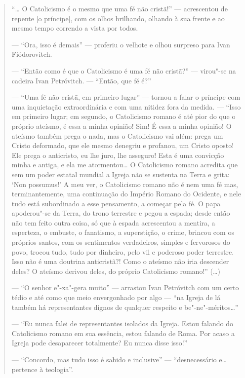 \begin{quote}
``\ldots{} O Catolicismo é o mesmo que uma fé não cristã!'' --- acrescentou
de repente [o príncipe], com os olhos brilhando,
olhando à sua frente e ao mesmo tempo correndo a vista por todos.

--- ``Ora, isso é demais'' --- proferiu o velhote e olhou surpreso
para Ivan Fiódorovitch.

--- ``Então como é que o Catolicismo é uma fé não
cristã?'' --- virou"-se na cadeira Ivan Petróvitch. --- ``Então, que fé é?''

--- ``Uma fé não cristã, em primeiro lugar'' --- tornou a falar o
príncipe com uma inquietação extraordinária e com uma nitidez fora da
medida. --- ``Isso em primeiro lugar; em segundo, o Catolicismo romano é
até pior do que o próprio ateísmo, é essa a minha opinião! Sim! É essa a
minha opinião! O ateísmo também prega o nada, mas o Catolicismo vai
além: prega um Cristo deformado, que ele mesmo denegriu e profanou, um
Cristo oposto! Ele prega o anticristo, eu lhe juro, lhe asseguro! Esta é
uma convicção minha e antiga, e ela me atormentou\ldots{} O Catolicismo romano
acredita que sem um poder estatal mundial a Igreja não se sustenta na
Terra e grita: `Non possumus!' A meu ver, o Catolicismo romano não é
nem uma fé mas, terminantemente, uma continuação do Império Romano do
Ocidente, e nele tudo está subordinado a esse pensamento, a começar pela
fé. O papa apoderou"-se da Terra, do trono terrestre e pegou a espada;
desde então não tem feito outra coisa, só que à espada acrescentou a
mentira, a esperteza, o embuste, o fanatismo, a superstição, o crime,
brincou com os próprios santos, com os sentimentos verdadeiros, simples
e fervorosos do povo, trocou tudo, tudo por dinheiro, pelo vil e
poderoso poder terrestre. Isso não é uma doutrina anticristã?! Como o
ateísmo não iria descender deles? O ateísmo derivou deles, do próprio
Catolicismo romano!'' (\ldots{})

--- ``O senhor e"-xa"-gera muito'' --- arrastou Ivan Petróvitch com um
certo tédio e até como que meio envergonhado por algo --- ``na Igreja de
lá também há representantes dignos de qualquer respeito e
be"-ne"-méritos\ldots{}''

--- ``Eu nunca falei de representantes isolados da Igreja. Estou
falando do Catolicismo romano em sua essência, estou falando de Roma.
Por acaso a Igreja pode desaparecer totalmente? Eu nunca disse isso!''

--- ``Concordo, mas tudo isso é sabido e inclusive'' ---
``desnecessário e\ldots{} pertence à teologia''.


\end{quote}
